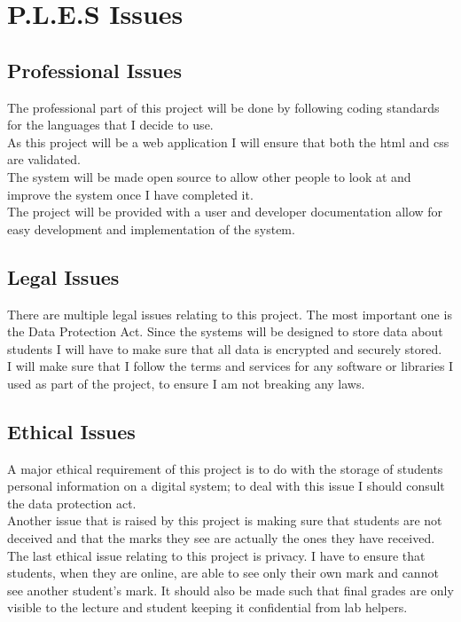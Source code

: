 \documentclass[12pt]{article}  %
\begin{document}
\newpage


\section{P.L.E.S Issues}


\subsection{Professional Issues}
The professional part of this project will be done by following coding standards for the languages that I decide to use.\\
As this project will be a web application I will ensure that both the html and css are validated.\\
The system will be made open source to allow other people to look at and improve the system once I have completed it.\\
The project will be provided with a  user and developer documentation allow for easy development and implementation of the system.


\subsection{Legal Issues}
There are multiple legal issues relating to this project. The most important one is the Data Protection Act. Since the systems will be designed to store data about students I will have to make sure that all data is encrypted and securely stored.\\
I will make sure that I follow the terms and services for any software or libraries I used as part of the project, to ensure I am not breaking any laws.


\subsection{Ethical Issues}
A major ethical requirement of this project is to do with the storage of students personal information on a digital system; to deal with this issue I should consult the data protection act. \\
Another issue that is raised by this project is making sure that students are not deceived and that the marks they see are actually the ones they have received.\\
The last ethical issue relating to this project is privacy. I have to  ensure that students, when they are online, are able to see only their own mark and cannot see another student's mark. It should also be made such that final grades are only visible to the lecture and student keeping it confidential from lab helpers.
\end{document}
